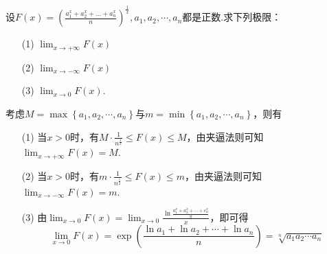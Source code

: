 \begin{xiti}
\begin{solution}
\end{solution}
\item 设$F ( x ) = \left( \frac { a _ { 1 } ^ { x } + a _ { 2 } ^ { x } + \ldots + a _ { n } ^ { x } } { n } \right) ^ { \frac { 1 } { x } } , a _ { 1 } , a _ { 2 } , \cdots , a _ { n }$都是正数.求下列极限：
\begin{enumerate}
	\item[(1)] $\lim _ { x \rightarrow + \infty } F ( x )$
	\item[(2)] $\lim _ { x \rightarrow - \infty } F ( x )$
	\item[(3)] $\lim _ { x \rightarrow 0 } F ( x )$.
\end{enumerate}
\begin{solution}
	考虑$M=\max \left\{a_{1}, a_{2}, \cdots, a_{n}\right\}$与$m=\min \left\{a_{1}, a_{2}, \cdots, a_{n}\right\}$，则有
	\begin{enumerate}
		\item[(1)] 当$x>0$时，有$M\cdot\frac{1}{n^{\frac{1}{2}}}\leq F\left(x\right)\leq M$，由夹逼法则可知$\lim _{x \rightarrow+\infty} F(x)=M$.
		\item[(2)] 当$x>0$时，有$m\cdot\frac{1}{n^{\frac{1}{2}}}\leq F\left(x\right)\leq m$，由夹逼法则可知$\lim _{x \rightarrow-\infty} F(x)=m$.
		\item[(3)] 由$\lim _{x \rightarrow 0} F(x)=\lim _{x \rightarrow 0} \frac{\ln \frac{a_{1}^{x}+a_{2}^{x}+\cdots+e_{n}^{x}}{\pi}}{x}$，即可得
		\[
		\lim_{x\rightarrow 0}F\left(x\right)=\exp\left(\frac{\ln a_1+\ln a_2+\cdots +\ln a_n}{n}\right)=\sqrt[n]{a_1a_2\cdots a_n}
		\]
	\end{enumerate}
	
\end{solution}


\end{xiti}
